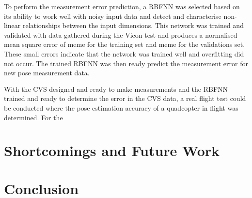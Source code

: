 To perform the measurement error prediction, a RBFNN was selected based on its ability to work well with noisy input data and detect and characterise non-linear relationships between the input dimensions. This network was trained and validated with data gathered during the Vicon test and produces a normalised mean square error of meme for the training set and meme for the validations set. These small errors indicate that the network was trained well and overfitting did not occur. The trained RBFNN was then ready predict the measurement error for new pose measurement data.

With the CVS designed and ready to make measurements and the RBFNN trained and ready to determine the error in the CVS data, a real flight test could be conducted where the pose estimation accuracy of a quadcopter in flight was determined. For the 

\section{Shortcomings and Future Work}

\section{Conclusion}


